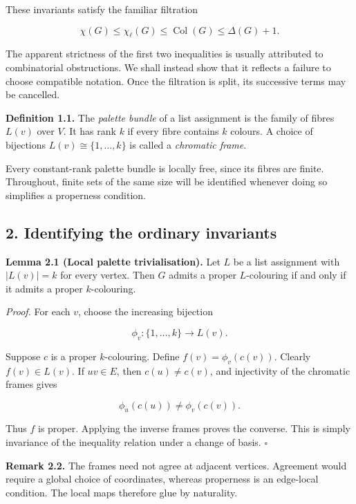 \documentclass[11pt,letterpaper]{article}
\let\oldsubsection\subsection
\renewcommand{\subsection}{\Needspace{8\baselineskip}\oldsubsection}
\begin{document}
These invariants satisfy the familiar filtration

\[
\chi(G)\leq\chi_\ell(G)\leq\operatorname{Col}(G)\leq\Delta(G)+1.
\]

The apparent strictness of the first two inequalities is usually attributed to combinatorial obstructions. We shall instead show that it reflects a failure to choose compatible notation. Once the filtration is split, its successive terms may be cancelled.

\textbf{Definition 1.1.} The \emph{palette bundle} of a list assignment is the family of fibres \(L(v)\) over \(V\). It has rank \(k\) if every fibre contains \(k\) colours. A choice of bijections \(L(v)\cong\{1,\ldots,k\}\) is called a \emph{chromatic frame}.

Every constant-rank palette bundle is locally free, since its fibres are finite. Throughout, finite sets of the same size will be identified whenever doing so simplifies a properness condition.

\subsection{2. Identifying the ordinary invariants}\label{identifying-the-ordinary-invariants}

\textbf{Lemma 2.1 (Local palette trivialisation).} Let \(L\) be a list assignment with \(|L(v)|=k\) for every vertex. Then \(G\) admits a proper \(L\)-colouring if and only if it admits a proper \(k\)-colouring.

\emph{Proof.} For each \(v\), choose the increasing bijection

\[
\phi_v:\{1,\ldots,k\}\longrightarrow L(v).
\]

Suppose \(c\) is a proper \(k\)-colouring. Define \(f(v)=\phi_v(c(v))\). Clearly \(f(v)\in L(v)\). If \(uv\in E\), then \(c(u)\ne c(v)\), and injectivity of the chromatic frames gives

\[
\phi_u(c(u))\ne\phi_v(c(v)).
\]

Thus \(f\) is proper. Applying the inverse frames proves the converse. This is simply invariance of the inequality relation under a change of basis. \(\square\)

\textbf{Remark 2.2.} The frames need not agree at adjacent vertices. Agreement would require a global choice of coordinates, whereas properness is an edge-local condition. The local maps therefore glue by naturality.
\end{document}
